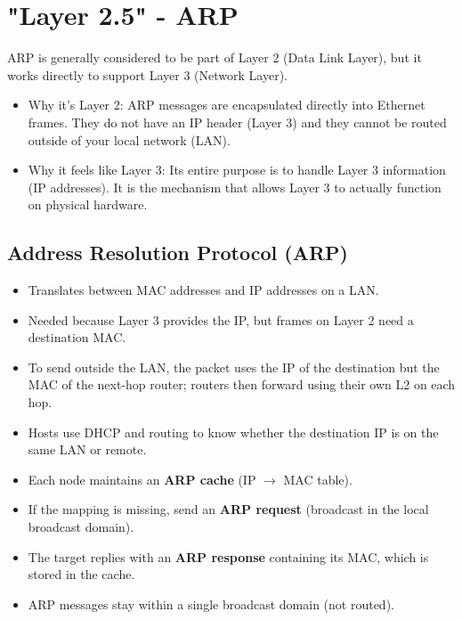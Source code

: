 \section{"Layer 2.5" - ARP}
ARP is generally considered to be part of Layer 2 (Data Link Layer), but it works directly to support Layer 3 (Network Layer).
\begin{itemize}
    \item Why it's Layer 2: ARP messages are encapsulated directly into Ethernet frames. They do not have an IP header (Layer 3) and they cannot be routed outside of your local network (LAN).
    \item Why it feels like Layer 3: Its entire purpose is to handle Layer 3 information (IP addresses). It is the mechanism that allows Layer 3 to actually function on physical hardware.
\end{itemize}
\subsection{Address Resolution Protocol (ARP)}
\begin{itemize}
	\item Translates between MAC addresses and IP addresses on a LAN.
	\item Needed because Layer 3 provides the IP, but frames on Layer 2 need a destination MAC.
	\item To send outside the LAN, the packet uses the IP of the destination but the MAC of the next-hop router; routers then forward using their own L2 on each hop.
	\item Hosts use DHCP and routing to know whether the destination IP is on the same LAN or remote.
	\item Each node maintains an \textbf{ARP cache} (IP $\rightarrow$ MAC table).
	\item If the mapping is missing, send an \textbf{ARP request} (broadcast in the local broadcast domain).
	\item The target replies with an \textbf{ARP response} containing its MAC, which is stored in the cache.
	\item ARP messages stay within a single broadcast domain (not routed).
\end{itemize}